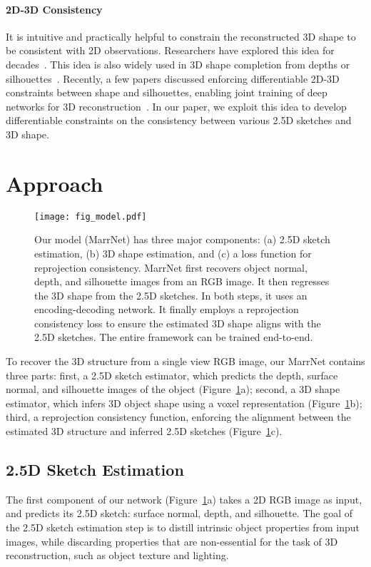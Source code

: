 \documentclass{article}
\newcommand{\fig}[1]{Figure~\ref{#1}}
\newcommand{\myparagraph}[1]{\vspace{-3pt}\paragraph{#1}}
\newcommand{\model}{MarrNet\xspace}
\begin{document}
\myparagraph{2D-3D Consistency} It is intuitive and practically helpful to constrain the reconstructed 3D shape to be consistent with 2D observations. Researchers have explored this idea for decades~\citep{Lowe1987}. This idea is also widely used in 3D shape completion from depths or silhouettes~\citep{Firman2016Structured,Rock2015Completing,Dai2017Shape}. Recently, a few papers discussed enforcing differentiable 2D-3D constraints between shape and silhouettes, enabling joint training of deep networks for 3D reconstruction~\citep{Wu2016b,Yan2016,Rezende2016,tulsiani2017multi}. In our paper, we exploit this idea to develop differentiable constraints on the consistency between various 2.5D sketches and 3D shape.

 \section{Approach}
\label{sec:model}

\begin{figure}[t]
    \centering
    \texttt{[image: fig\_model.pdf]}
    \caption{Our model (\model) has three major components: (a) 2.5D sketch estimation, (b) 3D shape estimation, and (c) a loss function for reprojection consistency. \model first recovers object normal, depth, and silhouette images from an RGB image. It then regresses the 3D shape from the 2.5D sketches. In both steps, it uses an encoding-decoding network. It finally employs a reprojection consistency loss to ensure the estimated 3D shape aligns with the 2.5D sketches. The entire framework can be trained end-to-end.} 
    \vspace{-5pt}
    \label{fig:model}
\end{figure} \label{sec:step1}

To recover the 3D structure from a single view RGB image, our MarrNet contains three parts: first, a 2.5D sketch estimator, which predicts the depth, surface normal, and silhouette images of the object (\fig{fig:model}a); second, a 3D shape estimator, which infers 3D object shape using a voxel representation (\fig{fig:model}b); third, a reprojection consistency function, enforcing the alignment between the estimated 3D structure and inferred 2.5D sketches (\fig{fig:model}c).

\subsection{2.5D Sketch Estimation}
The first component of our network (\fig{fig:model}a) takes a 2D RGB image as input, and predicts its 2.5D sketch: surface normal, depth, and silhouette. The goal of the 2.5D sketch estimation step is to distill intrinsic object properties from input images, while discarding properties that are non-essential for the task of 3D reconstruction, such as object texture and lighting.
\end{document}
